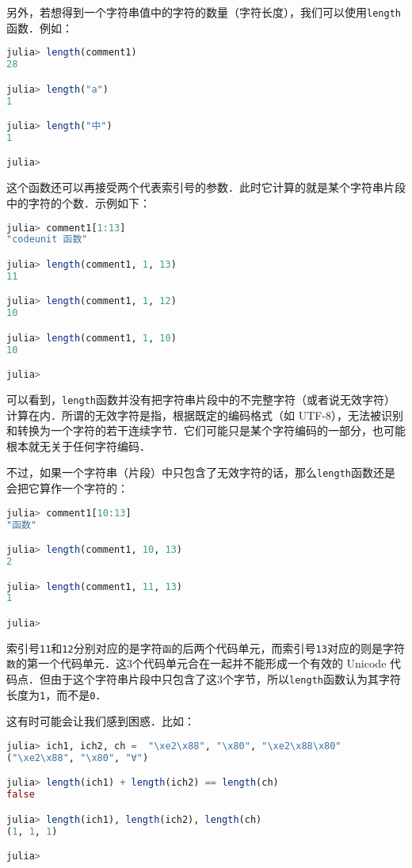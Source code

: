 另外，若想得到一个字符串值中的字符的数量（字符长度），我们可以使用\verb|length|函数．例如：
\begin{lstlisting}[language=julia]
julia> length(comment1)
28

julia> length("a")
1

julia> length("中")
1

julia> 
\end{lstlisting}

这个函数还可以再接受两个代表索引号的参数．此时它计算的就是某个字符串片段中的字符的个数．示例如下：
\begin{lstlisting}[language=julia]
julia> comment1[1:13]
"codeunit 函数"

julia> length(comment1, 1, 13)
11

julia> length(comment1, 1, 12)
10

julia> length(comment1, 1, 10)
10

julia> 
\end{lstlisting}

可以看到，\verb|length|函数并没有把字符串片段中的不完整字符（或者说无效字符）计算在内．所谓的无效字符是指，根据既定的编码格式（如 UTF-8），无法被识别和转换为一个字符的若干连续字节．它们可能只是某个字符编码的一部分，也可能根本就无关于任何字符编码．

不过，如果一个字符串（片段）中只包含了无效字符的话，那么\verb|length|函数还是会把它算作一个字符的：
\begin{lstlisting}[language=julia]
julia> comment1[10:13]
"函数"

julia> length(comment1, 10, 13)
2

julia> length(comment1, 11, 13)
1

julia> 
\end{lstlisting}

索引号\verb|11|和\verb|12|分别对应的是字符\verb|函|的后两个代码单元，而索引号\verb|13|对应的则是字符\verb|数|的第一个代码单元．这3个代码单元合在一起并不能形成一个有效的 Unicode 代码点．但由于这个字符串片段中只包含了这3个字节，所以\verb|length|函数认为其字符长度为\verb|1|，而不是\verb|0|．

这有时可能会让我们感到困惑．比如：
\begin{lstlisting}[language=julia]
julia> ich1, ich2, ch =  "\xe2\x88", "\x80", "\xe2\x88\x80"
("\xe2\x88", "\x80", "∀")

julia> length(ich1) + length(ich2) == length(ch)
false

julia> length(ich1), length(ich2), length(ch)
(1, 1, 1)

julia> 
\end{lstlisting}

